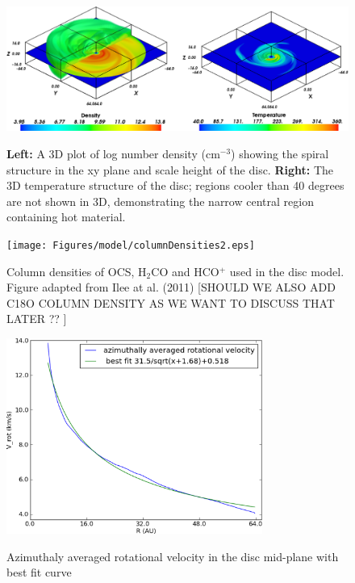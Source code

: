 \documentclass[useAMS,usenatbib]{mn2e}
\begin{document}
\begin{figure}
 \includegraphics[width=168mm]{Figures/model/rhoT6.eps}
 \label{rhoT} 
 \caption{{\bf Left:} A 3D plot of log number density (cm$^{-3}$) showing the spiral structure in the xy plane and scale height of the disc. {\bf Right:} The 3D temperature structure of the disc; regions cooler than 40 degrees are not shown in 3D, demonstrating the narrow central region containing hot material.}
\end{figure}

\begin{figure}
 \texttt{[image: Figures/model/columnDensities2.eps]}
 \label{Chemistry} 
 \caption{Column densities of OCS, H$_2$CO and HCO$^+$ used in the disc model. Figure adapted from Ilee at al. (2011) [SHOULD WE ALSO ADD C18O COLUMN DENSITY AS WE WANT TO DISCUSS THAT LATER ?? ]}
\end{figure}

\begin{figure}
 \includegraphics[width=84mm]{Figures/model/rotational_velocities.eps}
 \label{velocity}
 \caption{Azimuthaly averaged rotational velocity in the disc mid-plane with best fit curve}
\end{figure}
\end{document}
